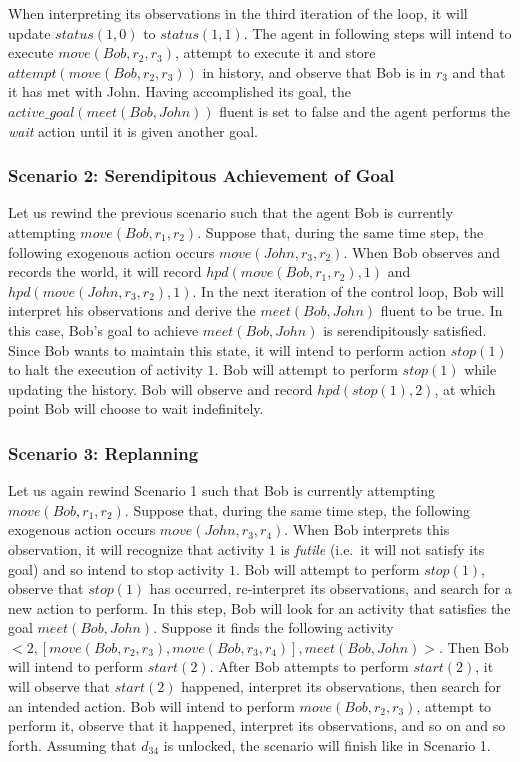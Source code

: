 When interpreting its observations in the third iteration of the loop, it will update $status(1,0)$ to $status(1,1)$.
The agent in following steps will intend to execute $move(Bob, r_2, r_3)$, attempt to execute it and store $attempt(move(Bob, r_2, r_3))$ in history, and observe that Bob is in $r_3$ and that it has met with John.
Having accomplished its goal, the $active\_goal(meet(Bob, John))$ fluent is set to false and the agent performs the \textit{wait} action until it is given another goal.

\subsubsection{Scenario 2: Serendipitous Achievement of Goal~\citep{blount_towards_2014}}
\label{subsubsec:aia_scenario_2}

Let us rewind the previous scenario such that the agent Bob is currently attempting $move(Bob, r_1, r_2)$.
Suppose that, during the same time step, the following exogenous action occurs $move(John, r_3, r_2)$.
When Bob observes and records the world, it will record $hpd(move(Bob, r_1, r_2), 1)$ and $hpd(move(John,r_3,r_2), 1)$.
In the next iteration of the control loop, Bob will interpret his observations and derive the $meet(Bob, John)$ fluent to be true.
In this case, Bob's goal to achieve $meet(Bob, John)$ is serendipitously satisfied.
Since Bob wants to maintain this state, it will intend to perform action $stop(1)$ to halt the execution of activity $1$.
Bob will attempt to perform $stop(1)$ while updating the history.
Bob will observe and record $hpd(stop(1), 2)$, at which point Bob will choose to wait indefinitely.

\subsubsection{Scenario 3: Replanning~\citep{blount_towards_2014}}
\label{subsubsec:aia_scenario_3}

Let us again rewind Scenario 1 such that Bob is currently attempting $move(Bob, r_1, r_2)$.
Suppose that, during the same time step, the following exogenous action occurs $move(John, r_3, r_4)$.
When Bob interprets this observation, it will recognize that activity $1$ is \textit{futile} (i.e.~it will not satisfy its goal) and so intend to stop activity $1$.
Bob will attempt to perform $stop(1)$, observe that $stop(1)$ has occurred, re-interpret its observations, and search for a new action to perform.
In this step, Bob will look for an activity that satisfies the goal $meet(Bob, John)$.
Suppose it finds the following activity $<2, [move(Bob, r_2,r_3), move(Bob, r_3,r_4)],meet(Bob,John)>$.
Then Bob will intend to perform $start(2)$.
After Bob attempts to perform $start(2)$, it will observe that $start(2)$ happened, interpret its observations, then search for an intended action.
Bob will intend to perform $move(Bob, r_2,r_3)$, attempt to perform it, observe that it happened, interpret its observations, and so on and so forth.
Assuming that $d_{34}$ is unlocked, the scenario will finish like in Scenario 1.


